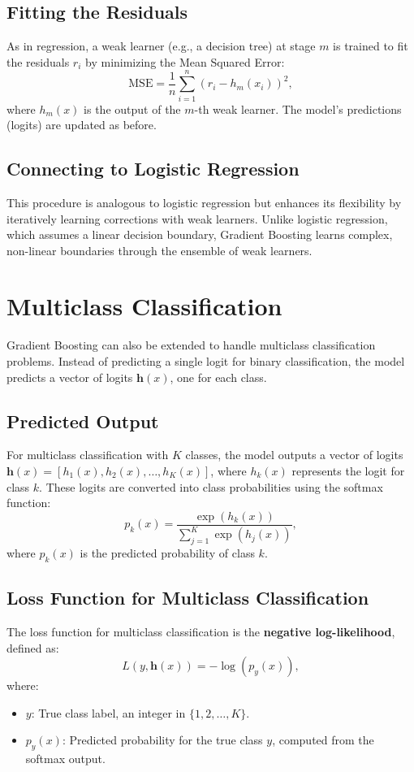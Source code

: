 \documentclass[12pt]{article}
\begin{document}
\subsection*{Fitting the Residuals}
As in regression, a weak learner (e.g., a decision tree) at stage $m$ is trained to fit the residuals \( r_i \) by minimizing the Mean Squared Error:
\[
\text{MSE} = \frac{1}{n} \sum_{i=1}^n (r_i - h_m(x_i))^2,
\]
where \( h_m(x) \) is the output of the \( m \)-th weak learner.
The model's predictions (logits) are updated as before.


\subsection*{Connecting to Logistic Regression}
This procedure is analogous to logistic regression but enhances its flexibility by iteratively learning corrections with weak learners. Unlike logistic regression, which assumes a linear decision boundary, Gradient Boosting learns complex, non-linear boundaries through the ensemble of weak learners.

\section*{Multiclass Classification}
Gradient Boosting can also be extended to handle multiclass classification problems. 
Instead of predicting a single logit for binary classification, the model predicts a 
vector of logits \( \mathbf{h}(x) \), one for each class. 

\subsection*{Predicted Output}
For multiclass classification with \( K \) classes, the model outputs a vector of logits \( \mathbf{h}(x) = [h_1(x), h_2(x), \ldots, h_K(x)] \), where \( h_k(x) \) represents the logit for class \( k \). These logits are converted into class probabilities using the softmax function:
\[
p_k(x) = \frac{\exp(h_k(x))}{\sum_{j=1}^K \exp(h_j(x))},
\]
where \( p_k(x) \) is the predicted probability of class \( k \).

\subsection*{Loss Function for Multiclass Classification}
The loss function for multiclass classification is the \textbf{negative log-likelihood}, defined as:
\[
L(y, \mathbf{h}(x)) = -\log(p_y(x)),
\]
where:
\begin{itemize}
    \item \( y \): True class label, an integer in \( \{1, 2, \ldots, K\} \).
    \item \( p_y(x) \): Predicted probability for the true class \( y \), computed from the softmax output.
\end{itemize}
\end{document}
